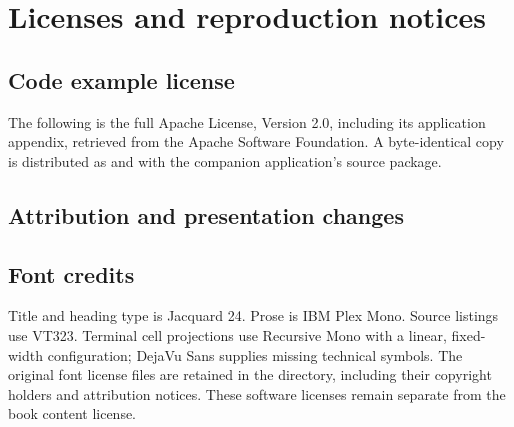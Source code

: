 \chapter{Licenses and reproduction notices}\label{book-licenses}

\section{Code example license}

The following is the full Apache License, Version 2.0, including its application appendix, retrieved from the Apache Software Foundation. A byte-identical copy is distributed as  and with the companion application's source package.


\section{Attribution and presentation changes}


\section{Font credits}

Title and heading type is Jacquard 24. Prose is IBM Plex Mono. Source listings use VT323. Terminal cell projections use Recursive Mono with a linear, fixed-width configuration; DejaVu Sans supplies missing technical symbols. The original font license files are retained in the  directory, including their copyright holders and attribution notices. These software licenses remain separate from the book content license.
